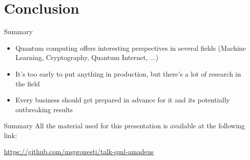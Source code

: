\graphicspath{{assets/conclusions/}}


\section{Conclusion}
    \begin{frame}{Summary}
        \begin{itemize}
            \item Quantum computing offers interesting perspectives in several fields (Machine Learning, Cryptography, Quantum Internet, ...)
            \item It's too early to put anything in \alert{production}, but there's a lot of \alert{research} in the field
            \item Every business should get prepared in advance for it and its potentially \alert{outbreaking} results
        \end{itemize}        
    \end{frame}

	\begin{frame}{Summary}
    	All the material used for this presentation is available at the following link:
		
    	\begin{center}
    		\url{https://github.com/mspronesti/talk-qml-amadeus}
    	\end{center}
    	\begin{center}\ccbysa\end{center}
    \end{frame}

